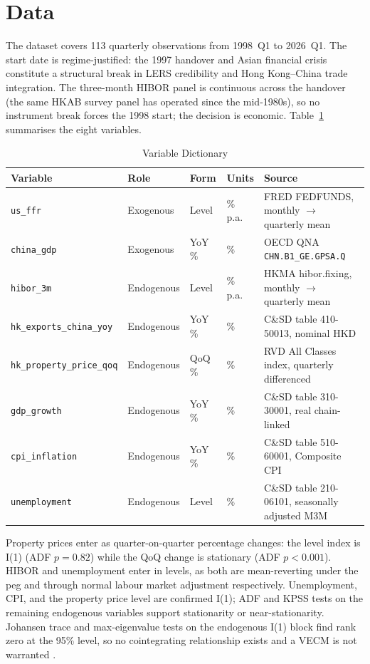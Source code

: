 \documentclass[12pt,a4paper]{article}
\begin{document}
\section{Data}
\label{sec:data}

The dataset covers 113 quarterly observations from 1998~Q1 to 2026~Q1. The start
date is regime-justified: the 1997 handover and Asian financial crisis constitute
a structural break in LERS credibility and Hong Kong--China trade integration.
The three-month HIBOR panel is continuous across the handover (the same HKAB
survey panel has operated since the mid-1980s), so no instrument break forces the
1998 start; the decision is economic. Table~\ref{tab:variables} summarises the
eight variables.

\begin{table}[htbp]
\centering
\caption{Variable Dictionary}
\label{tab:variables}
\small
\begin{tabular}{lllp{2cm}p{4.5cm}}
\toprule
Variable & Role & Form & Units & Source \\
\midrule
\texttt{us\_ffr}               & Exogenous  & Level   & \% p.a. & FRED FEDFUNDS, monthly $\to$ quarterly mean \\
\texttt{china\_gdp}            & Exogenous  & YoY \%  & \%      & OECD QNA \texttt{CHN.B1\_GE.GPSA.Q} \\
\addlinespace
\texttt{hibor\_3m}             & Endogenous & Level   & \% p.a. & HKMA hibor.fixing, monthly $\to$ quarterly mean \\
\texttt{hk\_exports\_china\_yoy} & Endogenous & YoY \% & \%     & C\&SD table 410-50013, nominal HKD \\
\texttt{hk\_property\_price\_qoq} & Endogenous & QoQ \% & \%   & RVD All Classes index, quarterly differenced \\
\texttt{gdp\_growth}           & Endogenous & YoY \%  & \%      & C\&SD table 310-30001, real chain-linked \\
\texttt{cpi\_inflation}        & Endogenous & YoY \%  & \%      & C\&SD table 510-60001, Composite CPI \\
\texttt{unemployment}          & Endogenous & Level   & \%      & C\&SD table 210-06101, seasonally adjusted M3M \\
\bottomrule
\end{tabular}
\end{table}

Property prices enter as quarter-on-quarter percentage changes: the level index
is I(1) (ADF $p = 0.82$) while the QoQ change is stationary (ADF $p < 0.001$).
HIBOR and unemployment enter in levels, as both are mean-reverting under the peg
and through normal labour market adjustment respectively. Unemployment, CPI, and
the property price level are confirmed I(1); ADF and KPSS tests on the remaining
endogenous variables support stationarity or near-stationarity. Johansen trace and
max-eigenvalue tests on the endogenous I(1) block find rank zero at the 95\% level,
so no cointegrating relationship exists and a VECM is not warranted
\citep{SimsStockWatson1990}.
\end{document}
